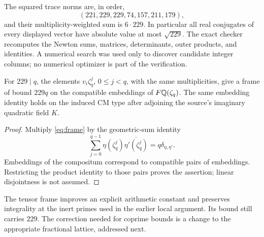 The squared trace norms are, in order,
\[
 (221,229,229,74,157,211,179),
\]
and their multiplicity-weighted sum is $6\cdot229$. In particular all real conjugates of every displayed vector have absolute value at most $\sqrt{229}$. The exact checker recomputes the Newton sums, matrices, determinants, outer products, and identities. A numerical search was used only to discover candidate integer columns; no numerical optimizer is part of the verification.

\begin{corollary}
For $229\mid q$, the elements $v_i\zeta_q^j$, $0\le j<q$, with the same multiplicities, give a frame of bound $229q$ on the compatible embeddings of $F\mathbb Q(\zeta_q)$. The same embedding identity holds on the induced CM type after adjoining the source's imaginary quadratic field $K$.
\end{corollary}

\begin{proof}
Multiply \eqref{eq:frame} by the geometric-sum identity
\[
 \sum_{j=0}^{q-1}\eta(\zeta_q^j)\overline{\eta'(\zeta_q^j)}
 =q\delta_{\eta,\eta'}.
\]
Embeddings of the compositum correspond to compatible pairs of embeddings. Restricting the product identity to those pairs proves the assertion; linear disjointness is not assumed.
\end{proof}

The tensor frame improves an explicit arithmetic constant and preserves integrality at the inert primes used in the earlier local argument. Its bound still carries $229$. The correction needed for coprime bounds is a change to the appropriate fractional lattice, addressed next.
